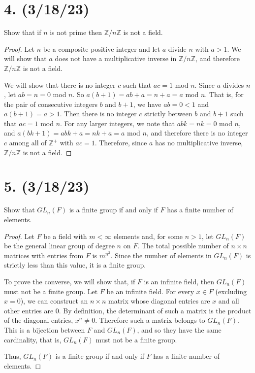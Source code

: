 \documentclass{article}
\begin{document}
\section*{4. (3/18/23)}

Show that if $n$ is not prime then $\mathbb{Z}/n\mathbb{Z}$ is not a field.

\begin{proof}
    Let $n$ be a composite positive integer and let $a$ divide $n$ with $a > 1$. We will show that $a$ does not have a multiplicative inverse in $\mathbb{Z}/n\mathbb{Z}$, and therefore $\mathbb{Z}/n\mathbb{Z}$ is not a field.

    We will show that there is no integer $c$ such that $ac = 1$ mod $n$. Since $a$ divides $n$, let $ab = n = 0$ mod $n$. So $a(b + 1) = ab + a = n + a = a$ mod $n$. That is, for the pair of consecutive integers $b$ and $b + 1$, we have $ab = 0 < 1$ and $a(b + 1) = a > 1$. Then there is no integer $c$ strictly between $b$ and $b + 1$ such that $ac = 1$ mod $n$. For any larger integers, we note that $abk = nk = 0$ mod $n$, and $a(bk + 1) = abk + a = nk + a = a$ mod $n$, and therefore there is no integer $c$ among all of $\mathbb{Z}^+$ with $ac = 1$. Therefore, since $a$ has no multiplicative inverse, $\mathbb{Z}/n\mathbb{Z}$ is not a field.
\end{proof}

\section*{5. (3/18/23)}

Show that $GL_n(F)$ is a finite group if and only if $F$ has a finite number of elements.

\begin{proof}
    Let $F$ be a field with $m < \infty$ elements and, for some $n > 1$, let $GL_n(F)$ be the general linear group of degree $n$ on $F$. The total possible number of $n \times n$ matrices with entries from $F$ is $m^{n^2}$. Since the number of elements in $GL_n(F)$ is strictly less than this value, it is a finite group.

    To prove the converse, we will show that, if $F$ is an infinite field, then $GL_n(F)$ must not be a finite group. Let $F$ be an infinite field. For every $x \in F$ (excluding $x = 0$), we can construct an $n \times n$ matrix whose diagonal entries are $x$ and all other entries are 0. By definition, the determinant of such a matrix is the product of the diagonal entries, $x^n \neq 0$. Therefore such a matrix belongs to $GL_n(F)$. This is a bijection between $F$ and $GL_n(F)$, and so they have the same cardinality, that is, $GL_n(F)$ must not be a finite group.

    Thus, $GL_n(F)$ is a finite group if and only if $F$ has a finite number of elements.
\end{proof}
\end{document}
